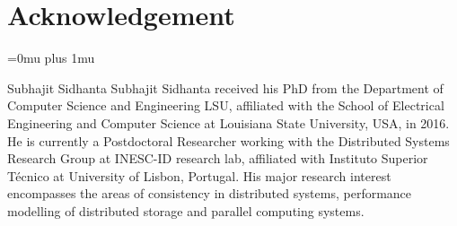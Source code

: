 \documentclass[journal,compsoc]{IEEEtran}
\begin{document}
%
\section{Acknowledgement}
\Urlmuskip=0mu plus 1mu\relax
\renewcommand{\bibfont}{\footnotesize}

%
%

\begin{IEEEbiography}{Subhajit Sidhanta}
Subhajit Sidhanta received his PhD from the Department of Computer Science and Engineering
LSU, affiliated with the School of Electrical Engineering and Computer Science at Louisiana State University, USA, in 2016. He is currently a Postdoctoral Researcher working with the Distributed Systems Research Group at INESC-ID research lab, affiliated with Instituto Superior Técnico at University of Lisbon, Portugal. His major research interest encompasses the areas of consistency in distributed systems, performance modelling of distributed storage and parallel computing systems.
\end{IEEEbiography}
\end{document}
